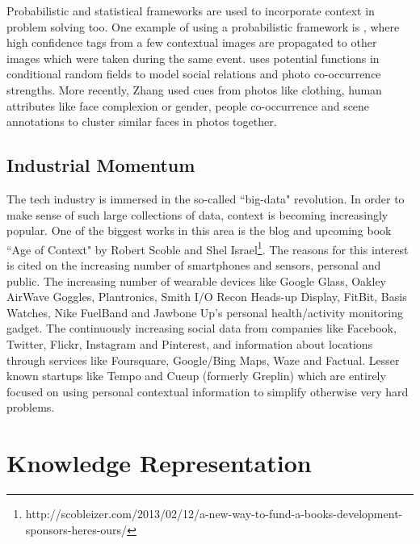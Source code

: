 Probabilistic and statistical frameworks are used to incorporate context in problem solving too. One example of using a probabilistic framework is \cite{cao2008annotating}, where high confidence tags from a few contextual images are propagated to other images which were taken during the same event. \cite{stone2008autotagging} uses potential functions in conditional random fields to model social relations and photo co-occurrence strengths. More recently, Zhang \cite{zhang2013unified} used cues from photos like clothing, human attributes like face complexion or gender, people co-occurrence and scene annotations to cluster similar faces in photos together.

\subsection{Industrial Momentum}
The tech industry is immersed in the so-called ``big-data" revolution. In order to make sense of such large collections of data, context is becoming increasingly popular. One of the biggest works in this area is the blog and upcoming book ``Age of Context" by Robert Scoble and Shel Israel\footnote{http://scobleizer.com/2013/02/12/a-new-way-to-fund-a-books-development-sponsors-heres-ours/}. The reasons for this interest is cited on the increasing number of smartphones and sensors, personal and public. The increasing number of wearable devices like Google Glass, Oakley AirWave Goggles, Plantronics, Smith I/O Recon Heads-up Display, FitBit, Basis Watches, Nike FuelBand  and Jawbone Up's personal health/activity monitoring gadget. The continuously increasing social data from companies like Facebook, Twitter, Flickr, Instagram and Pinterest, and information about locations through services like Foursquare, Google/Bing Maps, Waze and Factual. Lesser known startups like Tempo and Cueup (formerly Greplin) which are entirely focused on using personal contextual information to simplify otherwise very hard problems.

\section{Knowledge Representation}

